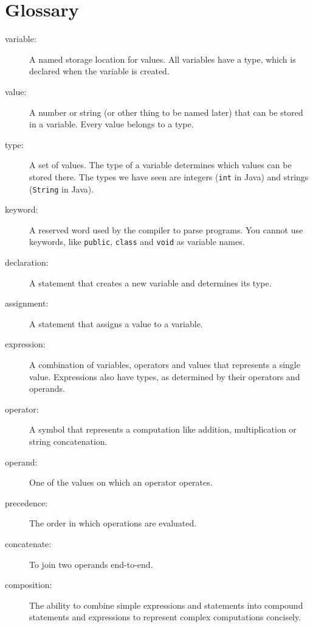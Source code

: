\section{Glossary}

\begin{description}

\item[variable:] A named storage location for values.  All
variables have a type, which is declared when the variable
is created.

\item[value:] A number or string (or other thing to be named later)
that can be stored in a variable.  Every value belongs to a type.

\item[type:] A set of values.  The type of a variable
determines which values can be stored there.  The types
we have seen are integers ({\tt int} in Java) and strings
({\tt String} in Java).

\item[keyword:]  A reserved word used by the compiler
to parse programs.  You cannot use keywords, like {\tt public},
{\tt class} and {\tt void} as variable names.

\item[declaration:] A statement that creates a new variable and
determines its type.

\item[assignment:] A statement that assigns a value to a variable.

\item[expression:] A combination of variables, operators and
values that represents a single value.  Expressions also
have types, as determined by their operators and operands.

\item[operator:] A symbol that represents a
computation like addition, multiplication or string
concatenation.

\item[operand:] One of the values on which an operator operates.

\item[precedence:] The order in which operations are evaluated.

\item[concatenate:] To join two operands end-to-end.

\item[composition:] The ability to combine simple
expressions and statements into compound statements and expressions
to represent complex computations concisely.


\end{description}



